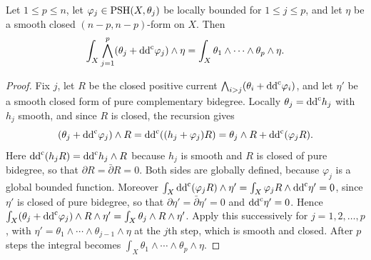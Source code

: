 \begin{proposition}\label{prop:bounded-global-cohomological-mass}
Let $1\leq p\leq n$, let $\varphi_j\in\mathrm{PSH}(X,\theta_j)$ be locally bounded for $1\leq j\leq p$, and let $\eta$ be a smooth closed $(n-p,n-p)$-form on $X$. Then
\[
 \int_X\bigwedge_{j=1}^p(\theta_j+\mathrm{dd}^{\mathrm{c}}\varphi_j)\wedge\eta
       =\int_X\theta_1\wedge\cdots\wedge\theta_p\wedge\eta.
\]
\end{proposition}
\begin{proof}
Fix $j$, let $R$ be the closed positive current $\bigwedge_{i>j}(\theta_i+\mathrm{dd}^{\mathrm{c}}\varphi_i)$, and let $\eta'$ be a smooth closed form of pure complementary bidegree. Locally $\theta_j=\mathrm{dd}^{\mathrm{c}} h_j$ with $h_j$ smooth, and since $R$ is closed, the recursion gives
\[
 (\theta_j+\mathrm{dd}^{\mathrm{c}}\varphi_j)\wedge R=\mathrm{dd}^{\mathrm{c}}((h_j+\varphi_j)R)=\theta_j\wedge R+\mathrm{dd}^{\mathrm{c}}(\varphi_jR).
\]
Here $\mathrm{dd}^{\mathrm{c}}(h_jR)=\mathrm{dd}^{\mathrm{c}} h_j\wedge R$ because $h_j$ is smooth and $R$ is closed of pure bidegree, so that $\partial R=\bar\partial R=0$. Both sides are globally defined, because $\varphi_j$ is a global bounded function. Moreover $\int_X\mathrm{dd}^{\mathrm{c}}(\varphi_jR)\wedge\eta'=\int_X\varphi_jR\wedge\mathrm{dd}^{\mathrm{c}}\eta'=0$, since $\eta'$ is closed of pure bidegree, so that $\partial\eta'=\bar\partial\eta'=0$ and $\mathrm{dd}^{\mathrm{c}}\eta'=0$. Hence $\int_X(\theta_j+\mathrm{dd}^{\mathrm{c}}\varphi_j)\wedge R\wedge\eta'=\int_X\theta_j\wedge R\wedge\eta'$. Apply this successively for $j=1,2,\ldots,p$, with $\eta'=\theta_1\wedge\cdots\wedge\theta_{j-1}\wedge\eta$ at the $j$th step, which is smooth and closed. After $p$ steps the integral becomes $\int_X\theta_1\wedge\cdots\wedge\theta_p\wedge\eta$.
\end{proof}

